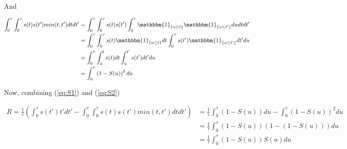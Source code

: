 \documentclass[ba]{imsart}\usepackage[]{graphicx}\usepackage[]{xcolor}
\numberwithin{equation}{section}
\theoremstyle{plain}
\begin{document}
\begin{supplement}
And

\begin{equation} \label{eq:S2}
\begin{aligned}
\int_{0}^{\tau} \int_{0}^{\tau} s(t) s(t') min(t,t') dt dt' &= \int_{0}^{\tau} \int_{0}^{\tau} s(t) s(t') \int_{0}^{\tau} \mathbbm{1}_{\{u \leq t \}} \mathbbm{1}_{\{u \leq t' \}} du dt dt' \\
&= \int_{0}^{\tau} \int_{0}^{\tau} s(t) \mathbbm{1}_{\{u \leq t \}}  dt  \int_{0}^{\tau}  s(t') \mathbbm{1}_{\{u \leq t' \}} dt' du \\
&= \int_{0}^{\tau} \int_{u}^{t} s(t) dt  \int_{u}^{t'} s(t') dt' du \\
&= \int_{0}^{\tau} \left( 1-S(u) \right)^2 du
\end{aligned}
\end{equation}

Now, combining (\ref{eq:S1}) and (\ref{eq:S2})

$$
\begin{aligned}
R= \frac{1}{\tau} \left( \int_{0}^{\tau} s(t') t' dt' - \int_{0}^{\tau} \int_{0}^{\tau} s(t) s(t') min(t,t') dt dt' \right)
&=\frac{1}{\tau} \int_{0}^{\tau} (1-S(u)) du -\int_{0}^{\tau} \left( 1-S(u) \right)^2 du \\
&=\frac{1}{\tau} \int_{0}^{\tau} (1-S(u)) \left( 1-(1-S(u)) \right) du \\
&=\frac{1}{\tau} \int_{0}^{\tau} (1-S(u)) S(u) du \\
\end{aligned}
$$

\end{supplement}




\end{document}
